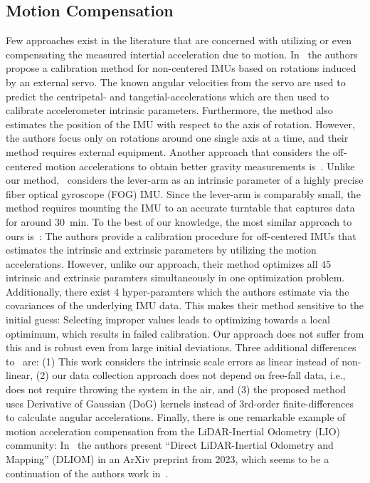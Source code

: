 \documentclass[journal]{IEEEtran}
\begin{document}
\subsection{Motion Compensation}
Few approaches exist in the literature that are concerned with utilizing or even compensating the measured intertial acceleration due to motion.
In~\cite{guner2022novel} the authors propose a calibration method for non-centered IMUs based on rotations induced by an external servo.
The known angular velocities from the servo are used to predict the centripetal- and tangetial-accelerations which are then used to calibrate accelerometer intrinsic parameters. 
Furthermore, the method also estimates the position of the IMU with respect to the axis of rotation.
However, the authors focus only on rotations around one single axis at a time, and their method requires external equipment.
Another approach that considers the off-centered motion accelerations to obtain better gravity measurements is~\cite{9110127}.
Unlike our method,~\cite{9110127} considers the lever-arm as an intrinsic parameter of a highly precise fiber optical gyroscope (FOG) IMU.
Since the lever-arm is comparably small, the method requires mounting the IMU to an accurate turntable that captures data for around $30$~min. 
To the best of our knowledge, the most similar approach to ours is~\cite{9423615}:
The authors provide a calibration procedure for off-centered IMUs that estimates the intrinsic and extrinsic parameters by utilizing the motion accelerations. 
However, unlike our approach, their method optimizes all $45$ intrinsic and extrinsic paramters simultaneously in one optimization problem.
Additionally, there exist $4$ hyper-paramters which the authors estimate via the covariances of the underlying IMU data.
This makes their method sensitive to the initial guess: 
Selecting improper values leads to optimizing towards a local optimimum, which results in failed calibration.
Our approach does not suffer from this and is robust even from large initial deviations. 
Three additional differences to~\cite{9423615} are: 
(1) This work considers the intrinsic scale errors as linear instead of non-linear, 
(2) our data collection approach does not depend on free-fall data, i.e., does not require throwing the system in the air, and 
(3) the proposed method uses Derivative of Gaussian (DoG) kernels instead of 3rd-order finite-differences to calculate angular accelerations.
Finally, there is one remarkable example of motion acceleration compensation from the LiDAR-Inertial Odometry (LIO) community:
In~\cite{chen2023direct} the authors present ``Direct LiDAR-Inertial Odometry and Mapping'' (DLIOM) in an ArXiv preprint from 2023, which seems to be a continuation of the authors work in~\cite{chen2022direct}.
\end{document}

